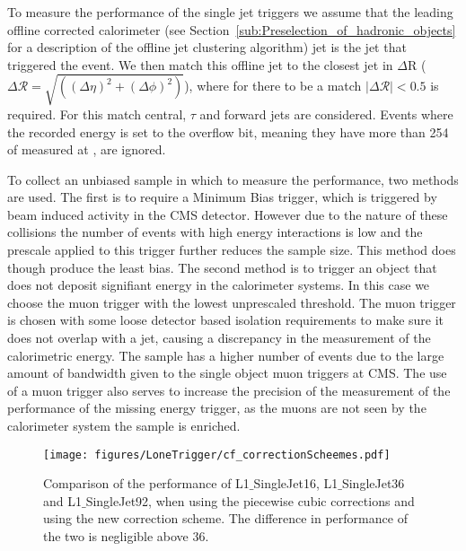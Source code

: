 To measure the performance of the \Lone single jet triggers we assume that the 
leading offline corrected \AK calorimeter (see 
Section~\ref{sub:Preselection_of_hadronic_objects} for a description of the 
offline jet clustering algorithm) jet is the jet that triggered the 
event. We then match this offline jet to the closest \Lone jet in $\Delta$R ($\Delta\mathcal{R} = \sqrt{((\Delta \eta)^{2} + (\Delta \phi)^{2})}$), 
where for there to be a match $|\Delta\mathcal{R}| < 0.5$ is required. For this match 
central, $\tau$ and forward jets are considered. Events where the recorded 
\Lone energy is set to the overflow bit, meaning they have more than 
\unit{254}{\GeV} of \ET measured at \Lone, are ignored.

To collect an unbiased sample in which to measure the performance, two 
methods are used. The first is to require a Minimum Bias trigger, which is 
triggered by beam induced activity in the CMS detector.
However due to the nature of these collisions the number of events with high 
energy interactions is low and the prescale applied to this trigger further 
reduces the sample size. This method does though produce the least bias.
The second method is to trigger an object that does not deposit signifiant 
energy in the calorimeter systems. In this case we choose the muon trigger with 
the lowest unprescaled \PT threshold. The muon trigger is chosen with some 
loose detector based isolation requirements to make sure it does not overlap with a jet, causing a discrepancy in the measurement of the calorimetric energy. The sample has a higher number of events due to the large amount of bandwidth given to the single object muon triggers at CMS. The use of a muon trigger also serves to increase the precision of the measurement of the performance of the \Lone missing energy trigger, as the muons are not seen by the calorimeter system the \MET sample is enriched.

\begin{figure}[htbp]
  \centering
    \texttt{[image: figures/LoneTrigger/cf\_correctionScheemes.pdf]}
  \caption{Comparison of the performance of L1$\_$SingleJet16, 
  L1$\_$SingleJet36 and L1$\_$SingleJet92, when using the piecewise cubic 
  corrections and using the new correction scheme. The difference in 
  performance of the two is negligible above 36\GeV.}
  \label{fig:figures_LoneTrigger_cf_correctionScheemes}
\end{figure}

